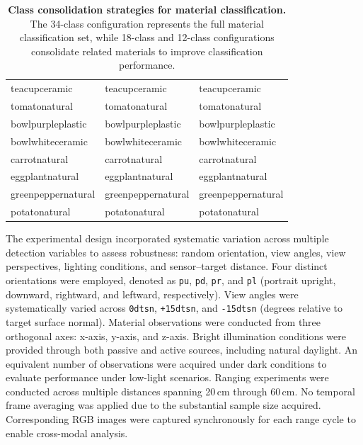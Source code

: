 \documentclass[12pt,a4paper,oneside]{report}
\begin{document}
\begin{table}
\begin{tabular}{p{7.5cm}p{7.5cm}p{7.5cm}}
teacupceramic & teacupceramic & teacupceramic \\
tomatonatural & tomatonatural & tomatonatural \\
bowlpurpleplastic & bowlpurpleplastic & bowlpurpleplastic \\
bowlwhiteceramic & bowlwhiteceramic & bowlwhiteceramic \\
carrotnatural & carrotnatural & carrotnatural \\
eggplantnatural & eggplantnatural & eggplantnatural \\
greenpeppernatural & greenpeppernatural & greenpeppernatural \\
potatonatural & potatonatural & potatonatural \\
\hline
\end{tabular}
\caption[Class consolidation strategies for material classification.]{\textbf{Class consolidation strategies for material classification.} The 34-class configuration represents the full material classification set, while 18-class and 12-class configurations consolidate related materials to improve classification performance.}
\label{tab:5_3}
\end{table}

The experimental design incorporated systematic variation across multiple detection variables to assess robustness: random orientation, view angles, view perspectives, lighting conditions, and sensor--target distance. Four distinct orientations were employed, denoted as \texttt{pu}, \texttt{pd}, \texttt{pr}, and \texttt{pl} (portrait upright, downward, rightward, and leftward, respectively). View angles were systematically varied across \texttt{0dtsn}, \texttt{+15dtsn}, and \texttt{-15dtsn} (degrees relative to target surface normal). Material observations were conducted from three orthogonal axes: x-axis, y-axis, and z-axis. Bright illumination conditions were provided through both passive and active sources, including natural daylight. An equivalent number of observations were acquired under dark conditions to evaluate performance under low-light scenarios. Ranging experiments were conducted across multiple distances spanning 20\,cm through 60\,cm. No temporal frame averaging was applied due to the substantial sample size acquired. Corresponding RGB images were captured synchronously for each range cycle to enable cross-modal analysis.
\end{document}
